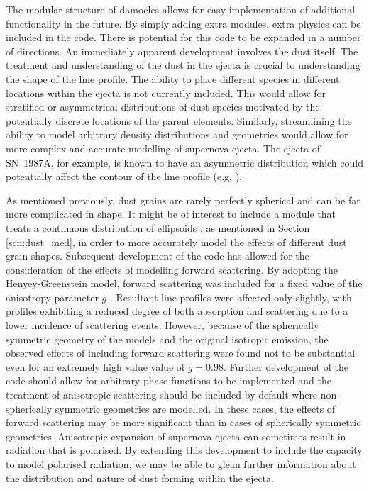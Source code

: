 The modular structure of {\sc damocles} allows for easy implementation of additional functionality in the future.  By simply adding extra modules, extra physics can be included in the code.  There is potential for this code to be expanded in a number of directions.  An immediately apparent development involves the dust itself.  The treatment and understanding of the dust in the ejecta is crucial to understanding the shape of the line profile.  The ability to place different species in different locations within the ejecta is not currently included.  This would allow for stratified or asymmetrical distributions of dust species motivated by the potentially discrete locations of the parent elements.  Similarly, streamlining the ability to model arbitrary density distributions and geometries would allow for more complex and accurate modelling of supernova ejecta.  The ejecta of SN~1987A, for example, is known to have an asymmetric distribution which could potentially affect the contour of the line profile (e.g. \citet{Sinnott2013}).

As mentioned previously, dust grains are rarely perfectly spherical and can be far more complicated in shape.  It might be of interest to include a module that treats a continuous distribution of ellipsoids  \citep{Bohren1983}, as mentioned in Section \ref{scn:dust_med}, in order to more accurately model the effects of different dust grain shapes.
%
Subsequent development of the code has allowed for the consideration of the effects of modelling forward scattering.  By adopting the Henyey-Greenstein model, forward scattering was included for a fixed value of the anisotropy parameter $g$ \citep{Henyey1941}.  Resultant line profiles were affected only slightly, with profiles exhibiting a reduced degree of both absorption and scattering due to a lower incidence of scattering events.  However, because of the spherically symmetric geometry of the models and the original isotropic emission, the observed effects of including forward scattering were found not to be substantial even for an extremely high value value of $g = 0.98$.  Further development of the code should allow for arbitrary phase functions to be implemented and the treatment of anisotropic scattering should be included by default where non-spherically symmetric geometries are modelled.  In these cases, the effects of forward scattering may be more significant than in cases of spherically symmetric geometries.  Anisotropic expansion of supernova ejecta can sometimes result in radiation that is polarised.  By extending this development to include the capacity to model polarised radiation, we may be able to glean further information about the distribution and nature of dust forming within the ejecta.  

